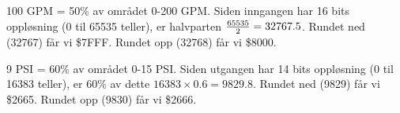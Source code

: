 





100 GPM = 50\% av området 0-200 GPM. Siden inngangen har 16 bits oppløsning (0 til 65535 teller), er halvparten ${65535 \over 2} = 32767.5$. Rundet ned (32767) får vi \$7FFF. Rundet opp (32768) får vi \$8000.

\vskip 10pt

9 PSI = 60\% av området 0-15 PSI. Siden utgangen har 14 bits oppløsning (0 til 16383 teller), er 60\% av dette $16383 \times 0.6 = 9829.8$. Rundet ned (9829) får vi \$2665. Rundet opp (9830) får vi \$2666.



